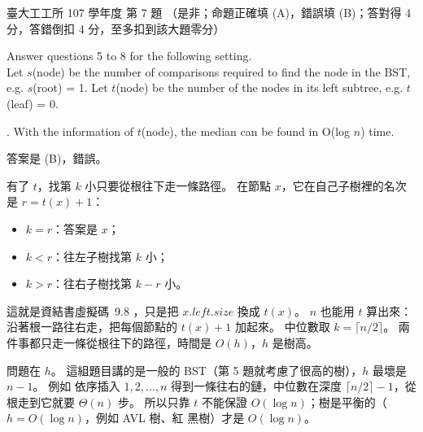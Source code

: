\begin{pastexam}[label={px:ntu-107-ie-ds-07}]{臺大工工所 107 學年度 第 7 題}
（是非；命題正確填 (A)，錯誤填 (B)；答對得 4 分，答錯倒扣 4 分，至多扣到該大題零分）

Answer questions 5 to 8 for the following setting.\\
Let $s$(node) be the number of comparisons required to find the node in the BST, e.g. $s$(root) = 1. Let $t$(node) be the number of the nodes in its left subtree, e.g. $t$(leaf) = 0.

. With the information of $t$(node), the median can be found in O(log $n$) time.
\end{pastexam}

\begin{pastsoln}
答案是 (B)，錯誤。

有了 $t$，找第 $k$ 小只要從根往下走一條路徑。 在節點 $x$，它在自己子樹裡的名次是
$r = t(x) + 1$：
\begin{itemize}
\item $k = r$：答案是 $x$；
\item $k < r$：往左子樹找第 $k$ 小；
\item $k > r$：往右子樹找第 $k - r$ 小。
\end{itemize}
這就是資結書虛擬碼~9.8 ，只是把 $x.\mathit{left}.\mathit{size}$ 換成
$t(x)$。 $n$ 也能用 $t$ 算出來：沿著根一路往右走，把每個節點的 $t(x) + 1$ 加起來。 中位數取
$k = \lceil n/2 \rceil$。 兩件事都只走一條從根往下的路徑，時間是 $O(h)$，$h$ 是樹高。

問題在 $h$。 這組題目講的是一般的 BST（第 5 題就考慮了很高的樹），$h$ 最壞是 $n - 1$。 例如
依序插入 $1, 2, \ldots, n$ 得到一條往右的鏈，中位數在深度 $\lceil n/2 \rceil - 1$，從根走到它就要
$\Theta(n)$ 步。 所以只靠 $t$ 不能保證 $O(\log n)$；樹是平衡的（$h = O(\log n)$，例如 AVL 樹、紅
黑樹）才是 $O(\log n)$。
\end{pastsoln}
